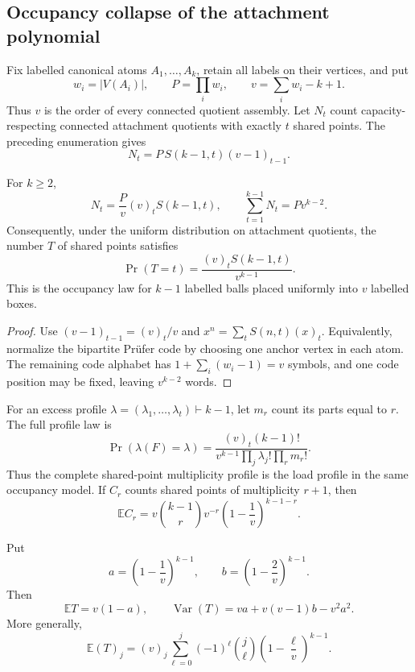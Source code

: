 \subsection{Occupancy collapse of the attachment polynomial}
\label{subsection-attachment-occupancy-collapse}

Fix labelled canonical atoms $A_1,\ldots,A_k$, retain all labels on their
vertices, and put
\[
w_i=|V(A_i)|,
\qquad
P=\prod_iw_i,
\qquad
v=\sum_iw_i-k+1.
\]
Thus $v$ is the order of every connected quotient assembly.  Let $N_t$ count
capacity-respecting connected attachment quotients with exactly $t$ shared
points.  The preceding enumeration gives
\[
N_t=P\,S(k-1,t)(v-1)_{t-1}.
\]

\begin{theorem}
\label{theorem-attachment-occupancy-collapse}
For $k\ge2$,
\[
N_t=\frac Pv(v)_tS(k-1,t),
\qquad
\sum_{t=1}^{k-1}N_t=Pv^{k-2}.
\tag{A.1}
\]
Consequently, under the uniform distribution on attachment quotients, the
number $T$ of shared points satisfies
\[
\Pr(T=t)=\frac{(v)_tS(k-1,t)}{v^{k-1}}.
\tag{A.2}
\]
This is the occupancy law for $k-1$ labelled balls placed uniformly into $v$
labelled boxes.
\end{theorem}
\begin{proof}
Use $(v-1)_{t-1}=(v)_t/v$ and
$x^n=\sum_tS(n,t)(x)_t$.  Equivalently, normalize the bipartite Prüfer code by
choosing one anchor vertex in each atom.  The remaining code alphabet has
$1+\sum_i(w_i-1)=v$ symbols, and one code position may be fixed, leaving
$v^{k-2}$ words.
\end{proof}

For an excess profile
$\lambda=(\lambda_1,\ldots,\lambda_t)\vdash k-1$, let $m_r$ count its parts
equal to $r$.  The full profile law is
\[
\Pr(\lambda(F)=\lambda)
=
\frac{(v)_t(k-1)!}
 {v^{k-1}\prod_j\lambda_j!\prod_rm_r!}.
\tag{A.3}
\]
Thus the complete shared-point multiplicity profile is the load profile in the
same occupancy model.  If $C_r$ counts shared points of multiplicity $r+1$,
then
\[
\mathbb EC_r
=v\binom{k-1}{r}v^{-r}
 \left(1-\frac1v\right)^{k-1-r}.
\tag{A.4}
\]

Put
\[
a=\left(1-\frac1v\right)^{k-1},
\qquad
b=\left(1-\frac2v\right)^{k-1}.
\]
Then
\[
\mathbb ET=v(1-a),
\qquad
\operatorname{Var}(T)=va+v(v-1)b-v^2a^2.
\tag{A.5}
\]
More generally,
\[
\mathbb E(T)_j
=(v)_j\sum_{\ell=0}^j(-1)^\ell\binom j\ell
\left(1-\frac\ell v\right)^{k-1}.
\tag{A.6}
\]

